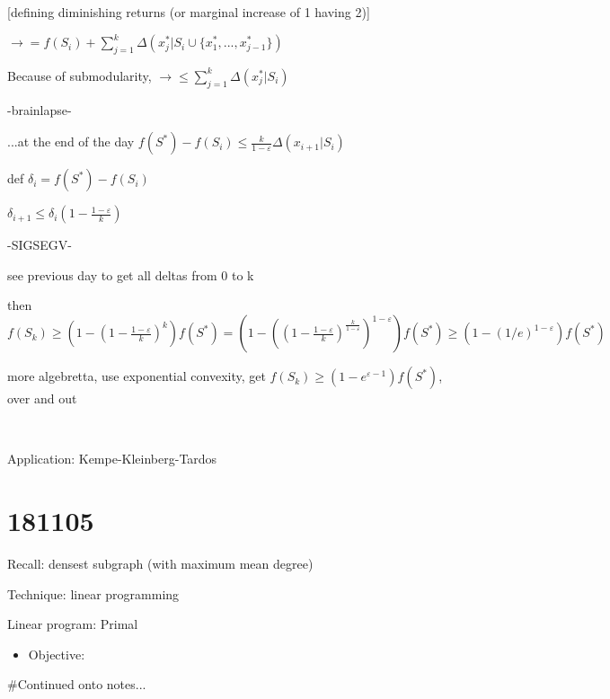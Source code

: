 \documentclass{report}
\begin{document}
	[defining diminishing returns (or marginal increase of {1} having {2})]
	
	$\to = f(S_i)+ \sum_{j=1}^{k}\Delta(x_j^* | S_i \cup \{x_1^*, ..., x_{j-1}^*\})$
	
	Because of submodularity, $\to \leq \sum_{j=1}^{k}\Delta(x_j^* | S_i)$
	
	-brainlapse-
	
	...at the end of the day $f(S^*) - f (S_i) \leq \frac{k}{1-\varepsilon}\Delta(x_{i+1}| S_i)$
	
	def $\delta_i = f(S^*) - f(S_i)$
	
	$\delta_{i+1} \leq \delta_i(1-\frac{1-\varepsilon}{k})$
	
	-SIGSEGV-
	
	see previous day to get all deltas from 0 to k
	
	then $f(S_k) \geq (1-(1-\frac{1-\varepsilon}{k})^k)f(S^*)=(1-((1-\frac{1-\varepsilon}{k})^{\frac{k}{1-\varepsilon}})^{1-\varepsilon})f(S^*) \geq (1-(1/e)^{1-\varepsilon})f(S^*)$
	
	more algebretta, use exponential convexity, get $f(S_k) \geq (1-e^{\varepsilon-1})f(S^*)$, over and out
	
	\
	
	Application: Kempe-Kleinberg-Tardos
	

	\chapter{181105}

	Recall: densest subgraph (with maximum mean degree)

	Technique: linear programming

	Linear program: Primal
	\begin{itemize}
		\item Objective: $ $
	\end{itemize}

	\#Continued onto notes...
\end{document}
